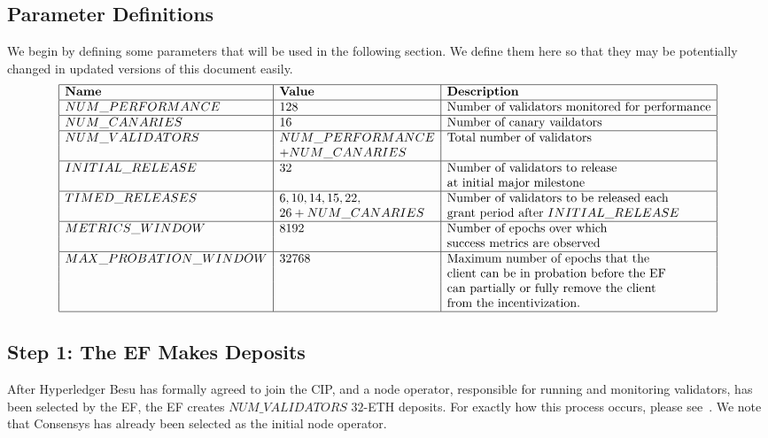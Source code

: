 \subsection{Parameter Definitions}
We begin by defining some parameters that will be used in the following section.  We define them here so that they may be potentially changed in updated versions of this document easily.
\[
\begin{array}{|l|l|l|}
\hline
\textbf{Name} & \textbf{Value} & \textbf{Description} \\
\hline
NUM\_PERFORMANCE & 128 & \text{Number of validators monitored for performance} \\
\hline
NUM\_CANARIES & 16 & \text{Number of canary vaildators} \\
\hline
NUM\_VALIDATORS & NUM\_PERFORMANCE & \text{Total number of validators} \\
&  + NUM\_CANARIES & \\
\hline
INITIAL\_RELEASE & 32 & \text{Number of validators to release} \\
& &  \text{at initial major milestone} \\
\hline
TIMED\_RELEASES & 6, 10, 14, 15, 22, & \text{Number of validators to be released each} \\
& 26 + NUM\_CANARIES & \text{grant period after } INITIAL\_RELEASE \\
\hline
METRICS\_WINDOW & 8192 & \text{Number of epochs over which} \\
& & \text{success metrics are observed} \\
\hline
MAX\_PROBATION\_WINDOW & 32768 & \text{Maximum number of epochs that the} \\
& & \text{client can be in probation before the EF} \\
& & \text{can partially or fully remove the client} \\
& & \text{from the incentivization.} \\
\hline
\end{array}
\]

\subsection{Step 1:  The EF Makes Deposits}
After Hyperledger Besu has formally agreed to join the CIP, and a node operator, responsible for running and monitoring validators, has been selected by the EF, the EF creates $NUM\_VALIDATORS$ $32$-ETH deposits.  For exactly how this process occurs, please see~\cite{EthVal}.  We note that Consensys has already been selected as the initial node operator.

